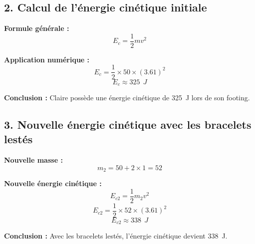 \documentclass[a4paper,12pt]{article}
\begin{document}
\subsection*{2. Calcul de l'énergie cinétique initiale}
\begin{compactitem}
    \item \textbf{Formule générale :}
    \begin{equation}
        E_c = \frac{1}{2} m v^2
    \end{equation}
    \item \textbf{Application numérique :}
    \begin{equation}
        E_c = \frac{1}{2} \times 50 \times (3.61)^2
    \end{equation}
    \begin{equation}
        E_c \approx 325\ \SI{}{J}
    \end{equation}
    \item \textbf{Conclusion :} Claire possède une énergie cinétique de \SI{325}{J} lors de son footing.
\end{compactitem}

\subsection*{3. Nouvelle énergie cinétique avec les bracelets lestés}
\begin{compactitem}
    \item \textbf{Nouvelle masse :}
    \begin{equation}
        m_2 = 50 + 2 \times 1 = 52
    \end{equation}
    \item \textbf{Nouvelle énergie cinétique :}
    \begin{equation}
        E_{c2} = \frac{1}{2} m_2 v^2
    \end{equation}
    \begin{equation}
        E_{c2} = \frac{1}{2} \times 52 \times (3.61)^2
    \end{equation}
    \begin{equation}
        E_{c2} \approx 338\ \SI{}{J}
    \end{equation}
    \item \textbf{Conclusion :} Avec les bracelets lestés, l'énergie cinétique devient \SI{338}{J}.
\end{compactitem}
\end{document}
